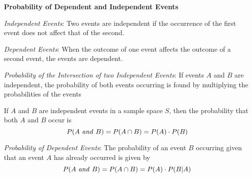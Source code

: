 \begin{center}
\textbf{Probability of Dependent and Independent Events
}
\end{center}

\vspace*{1ex}

\emph{Independent Events}: Two events are independent if the occurrence of the first event does not affect that  of the second. 

\vspce 

\emph{Dependent Events}: When the outcome of one event affects the outcome of a second event, the events are dependent.

\vspce 

\emph{Probability of the Intersection of two Independent Events}: 
If events $A$ and $B$ are independent, the probability of both events occurring is found by multiplying the probabilities of the events

\vspce 

If $A$ and $B$ are independent events in a sample space $S$, then the probability that both $A$ and $B$ occur is
\[
P(A \text{ \emph{and} } B) = P (A \cap B) = P(A) \cdot P(B)
\] 

\vspce 

\emph{Probability of Dependent Events}: 
The probability of an event $B$ occurring given that an event  $A$ has already occurred is given by
\[
P(A \text{ \emph{and} } B) = P (A \cap B) = P(A) \cdot P(B|A)
\] 
